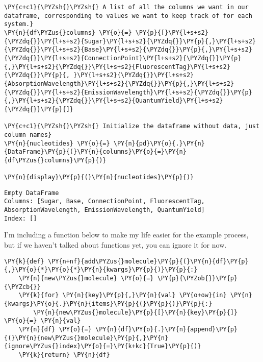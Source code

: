     \begin{tcolorbox}[breakable, size=fbox, boxrule=1pt, pad at break*=1mm,colback=cellbackground, colframe=cellborder]
\begin{Verbatim}[commandchars=\\\{\}]
\PY{c+c1}{\PYZsh{}\PYZsh{} A list of all the columns we want in our dataframe, corresponding to values we want to keep track of for each system.}
\PY{n}{df\PYZus{}columns} \PY{o}{=} \PY{p}{[}\PY{l+s+s2}{\PYZdq{}}\PY{l+s+s2}{Sugar}\PY{l+s+s2}{\PYZdq{}}\PY{p}{,}\PY{l+s+s2}{\PYZdq{}}\PY{l+s+s2}{Base}\PY{l+s+s2}{\PYZdq{}}\PY{p}{,}\PY{l+s+s2}{\PYZdq{}}\PY{l+s+s2}{ConnectionPoint}\PY{l+s+s2}{\PYZdq{}}\PY{p}{,}\PY{l+s+s2}{\PYZdq{}}\PY{l+s+s2}{FluorescentTag}\PY{l+s+s2}{\PYZdq{}}\PY{p}{, }\PY{l+s+s2}{\PYZdq{}}\PY{l+s+s2}{AbsorptionWavelength}\PY{l+s+s2}{\PYZdq{}}\PY{p}{,}\PY{l+s+s2}{\PYZdq{}}\PY{l+s+s2}{EmissionWavelength}\PY{l+s+s2}{\PYZdq{}}\PY{p}{,}\PY{l+s+s2}{\PYZdq{}}\PY{l+s+s2}{QuantumYield}\PY{l+s+s2}{\PYZdq{}}\PY{p}{]}

\PY{c+c1}{\PYZsh{}\PYZsh{} Initialize the dataframe without data, just column names}
\PY{n}{nucleotides} \PY{o}{=} \PY{n}{pd}\PY{o}{.}\PY{n}{DataFrame}\PY{p}{(}\PY{n}{columns}\PY{o}{=}\PY{n}{df\PYZus{}columns}\PY{p}{)}

\PY{n}{display}\PY{p}{(}\PY{n}{nucleotides}\PY{p}{)}
\end{Verbatim}
\end{tcolorbox}

    
    \begin{Verbatim}[commandchars=\\\{\}]
Empty DataFrame
Columns: [Sugar, Base, ConnectionPoint, FluorescentTag, AbsorptionWavelength, EmissionWavelength, QuantumYield]
Index: []
    \end{Verbatim}

    
    I'm including a function below to make my life easier for the example
process, but if we haven't talked about functions yet, you can ignore it
for now.

    \begin{tcolorbox}[breakable, size=fbox, boxrule=1pt, pad at break*=1mm,colback=cellbackground, colframe=cellborder]
\begin{Verbatim}[commandchars=\\\{\}]
\PY{k}{def} \PY{n+nf}{add\PYZus{}molecule}\PY{p}{(}\PY{n}{df}\PY{p}{,}\PY{o}{*}\PY{o}{*}\PY{n}{kwargs}\PY{p}{)}\PY{p}{:}
    \PY{n}{new\PYZus{}molecule} \PY{o}{=} \PY{p}{\PYZob{}}\PY{p}{\PYZcb{}}
    \PY{k}{for} \PY{n}{key}\PY{p}{,}\PY{n}{val} \PY{o+ow}{in} \PY{n}{kwargs}\PY{o}{.}\PY{n}{items}\PY{p}{(}\PY{p}{)}\PY{p}{:}
        \PY{n}{new\PYZus{}molecule}\PY{p}{[}\PY{n}{key}\PY{p}{]} \PY{o}{=} \PY{n}{val}
    \PY{n}{df} \PY{o}{=} \PY{n}{df}\PY{o}{.}\PY{n}{append}\PY{p}{(}\PY{n}{new\PYZus{}molecule}\PY{p}{,}\PY{n}{ignore\PYZus{}index}\PY{o}{=}\PY{k+kc}{True}\PY{p}{)}
    \PY{k}{return} \PY{n}{df}
\end{Verbatim}
\end{tcolorbox}

